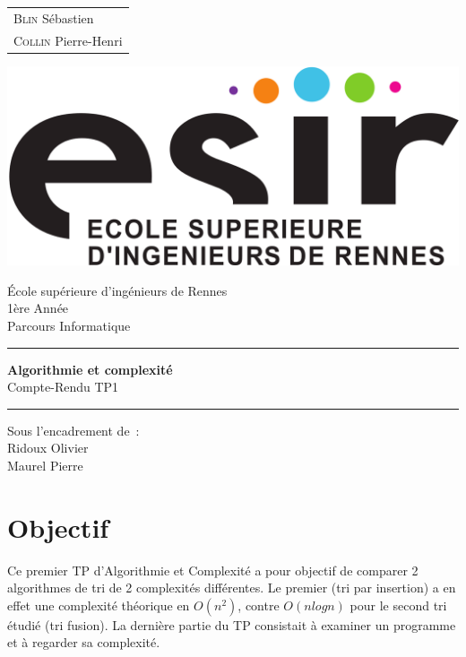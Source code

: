 \documentclass{article}
\begin{document}
\begin{titlepage}
	\vspace{-20px}
	\begin{tabular}{l}
		\textsc{Blin} S\'ebastien\\
		\textsc{Collin} Pierre-Henri
	\end{tabular}
	\hfill \vspace{10px}\includegraphics[scale=0.1]{esir.png}\\
	\vfill
	\begin{center}
		\Huge{\'Ecole sup\'erieure d'ing\'enieurs de Rennes}\\
		\vspace{1cm}
		\LARGE{1\`ere Ann\'ee}\\
		\large{Parcours Informatique}\\
		\vspace{0.5cm}\hrule\vspace{0.5cm}
		\LARGE{\textbf{Algorithmie et complexité}}\\
		\Large{Compte-Rendu TP1}
		\vspace{0.5cm}\hrule
		\vfill
		\vfill
	\end{center}
	\begin{flushleft}
		\Large{Sous l'encadrement de~:}\\
		\vspace{0.2cm}
		\large{{Ridoux} Olivier}\\
		\large{{Maurel} Pierre}
	\end{flushleft}
	\vfill
\end{titlepage}

\section{Objectif}
Ce premier TP d'Algorithmie et Complexité a pour objectif de comparer 2 algorithmes de tri de 2 complexités différentes. Le premier (tri par insertion) a en effet une complexité théorique en $O(n^2)$, contre $O(nlogn)$ pour le second tri étudié (tri fusion). La dernière partie du TP consistait à examiner un programme et à regarder sa complexité.
\end{document}
